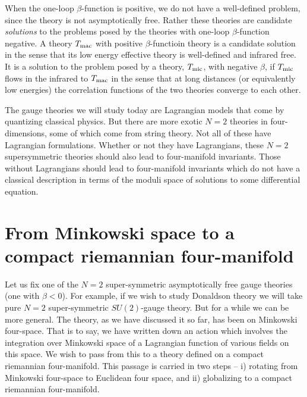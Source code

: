 \documentclass[10pt]{article}
\begin{document}
When the one-loop $\beta$-function is positive, we do not have a
well-defined problem, since the theory is not asymptotically
free. Rather these theories are candidate {\sl solutions} to the problems
posed by the theories with one-loop $\beta$-function negative. A
theory $T_{\rm mac}$ with positive $\beta$-functioin
theory is a candidate solution in the sense that its low energy
effective theory is well-defined and infrared free.  It is a solution
to the problem posed by a theory, $T_{\rm mic}$, with negative $\beta$,
if $T_{\rm mic}$ flows in the infrared to $T_{\rm mac}$ in the sense
that at long distances (or equivalently low energies) the correlation
functions of the two theories converge to each other.

The gauge theories we will study today are Lagrangian
models that come by quantizing classical physics.  But there are more 
exotic $N=2$ theories in four-dimensions, some of which come from
string theory. 
Not all of these have Lagrangian formulations.   Whether or not they have
Lagrangians, these $N=2$ supersymmetric  theories
should also lead to four-manifold invariants.  Those without
Lagrangians should lead to four-manifold
invariants which do not have a classical description in terms of the
moduli space of solutions to some differential equation.

\section{From Minkowski space to a compact riemannian
four-manifold} 

Let us fix one of the $N=2$ super-symmetric asymptotically free gauge
theories (one with $\beta<0$). For example, if we wish to study
Donaldson theory we will take pure $N=2$ super-symmetric $SU(2)$-gauge
theory.  But for a while we can be more general.
The theory, as we have discussed it so far, has been on Minkowski
four-space. That is to say, we have written down an action which
involves the integration over Minkowski space of a Lagrangian function
of various fields on this space.
We wish to pass from this to a theory defined on a  compact riemannian
four-manifold.
This passage is carried in two steps -- i) rotating from Minkowski
four-space to 
Euclidean four space, and ii) globalizing to a compact riemannian
four-manifold. 
\end{document}
